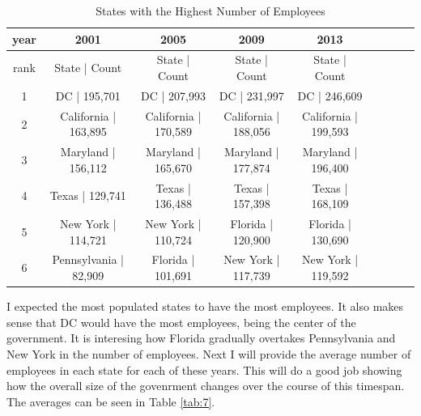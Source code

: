 \documentclass{article}
\begin{document}
            \begin{center}
                \begin{table}
                    \centering
                    \begin{tabular}{ |c|c|c|c|c|c|c|c|c| }
                        \hline
                        year & 2001 & 2005 & 2009 & 2013 \\
                        \hline
                        rank & State | Count & State | Count & State | Count & State | Count \\
                        \hline
                        1 & DC | 195,701 & DC | 207,993 & DC | 231,997 & DC | 246,609 \\
                        2 & California | 163,895 & California | 170,589 & California | 188,056 & California | 199,593 \\
                        3 & Maryland | 156,112 & Maryland | 165,670 & Maryland | 177,874 & Maryland | 196,400 \\
                        4 & Texas | 129,741 & Texas | 136,488 & Texas | 157,398 & Texas | 168,109 \\
                        5 & New York | 114,721 & New York | 110,724 & Florida | 120,900 & Florida | 130,690 \\
                        6 & Pennsylvania | 82,909 & Florida | 101,691 & New York | 117,739 & New York | 119,592 \\
                        \hline
                    \end{tabular}
                    \caption{States with the Highest Number of Employees}
                    \label{tab:6}
                \end{table}
            \end{center}

        I expected the most populated states to have the most employees. It also makes sense that DC would have the most employees, being the center of the government. It is interesing how Florida gradually overtakes Pennsylvania and New York in the number of employees. Next I will provide the average number of employees in each state for each of these years. This will do a good job showing how the overall size of the govenrment changes over the course of this timespan. The averages can be seen in Table \ref{tab:7}.
\end{document}
